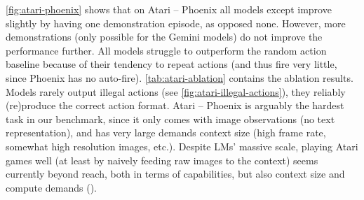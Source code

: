 \cref{fig:atari-phoenix} shows that on Atari -- Phoenix all models except \oone{} improve slightly by having one demonstration episode, as opposed none.
However, more demonstrations (only possible for the Gemini models) do not improve the performance further.
All models struggle to outperform the random action baseline because of their tendency to repeat actions (and thus fire very little, since Phoenix has no auto-fire).
\cref{tab:atari-ablation} contains the ablation results.
Models rarely output illegal actions (see \cref{fig:atari-illegal-actions}), \ie they reliably (re)produce the correct action format.
Atari -- Phoenix is arguably the hardest task in our benchmark, since it only comes with image observations (no text representation), and has very large demands \wrt context size (high frame rate, somewhat high resolution images, etc.). 
Despite LMs' massive scale, playing Atari games well (at least by naively feeding raw images to the context) seems currently beyond reach, both in terms of capabilities, but also \wrt context size and compute demands (\cf \citet{waytowich2024atari}).


